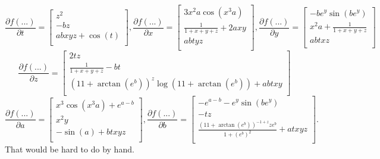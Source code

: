 $$ \frac{\partial f(...)}{ \partial t}  =  \left[
\begin{array}{c}
z^{2} \\
 - b z \\
a b x y z + \cos\left( t \right)  \\
\end{array}
\right], 
%
\frac{\partial f(...)}{ \partial x}  =  \left[
\begin{array}{c}
3 x^{2} a \cos\left( x^{3} a \right) \\
\frac{1}{1 + x + y + z} + 2 a x y \\
a b t y z \\
\end{array}
\right],
%
\frac{\partial f(...)}{ \partial y}  = \left[
\begin{array}{c}
 - b e^{y} \sin\left( b e^{y} \right) \\
x^{2} a + \frac{1}{1 + x + y + z} \\
a b t x z \\
\end{array}
\right]
$$
\vspace*{.1cm}
$$
\frac{\partial f(...)}{ \partial z}  =\left[
\begin{array}{c}
2 t z \\
\frac{1}{1 + x + y + z} - b t \\
\left( 11 + \arctan\left( e^{b} \right) \right)^{z} \log\left( 11 + \arctan\left( e^{b} \right) \right) + a b t x y \\
\end{array}
\right]
$$
\vspace*{.2cm}
%
$$
\frac{\partial f(...)}{ \partial a} = \left[
\begin{array}{c}
x^{3} \cos\left( x^{3} a \right) + e^{a - b} \\
x^{2} y \\
 - \sin\left( a \right) + b t x y z \\
\end{array}
\right],  
%
\frac{\partial f(...)}{ \partial b} = \left[
\begin{array}{c}
 - e^{a - b} - e^{y} \sin\left( b e^{y} \right) \\
 - t z \\
\frac{\left( 11 + \arctan\left( e^{b} \right) \right)^{-1 + z} z e^{b}}{1 + \left( e^{b} \right)^{2}} + a t x y z \\
\end{array}
\right].
$$
That would be hard to do by hand. 
\Qed


